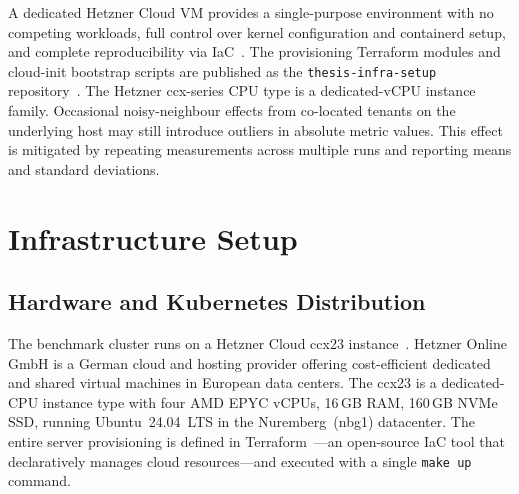 \begin{sloppypar}
A dedicated Hetzner Cloud \acs{VM} provides a single-purpose environment with no competing workloads, full control over kernel configuration and containerd setup, and complete reproducibility via \ac{IaC}~\cite{terraform2024hashicorp}. The provisioning Terraform modules and cloud-init bootstrap scripts are published as the \texttt{thesis-infra-setup} repository~\cite{musaev2026thesisinfra}. The Hetzner ccx-series \acs{CPU} type is a dedicated-vCPU instance family. Occasional noisy-neighbour effects from co-located tenants on the underlying host may still introduce outliers in absolute metric values. This effect is mitigated by repeating measurements across multiple runs and reporting means and standard deviations.
\end{sloppypar}

\section{Infrastructure Setup}
\label{sec:infra_setup}

\subsection{Hardware and Kubernetes Distribution}

\begin{sloppypar}
The benchmark cluster runs on a Hetzner Cloud ccx23 instance~\cite{hetzner2024cloud}. Hetzner Online GmbH is a German cloud and hosting provider offering cost-efficient dedicated and shared virtual machines in European data centers. The ccx23 is a dedicated-\acs{CPU} instance type with four \acs{AMD} EPYC vCPUs, 16\,GB \acs{RAM}, 160\,GB NVMe \acs{SSD}, running Ubuntu~24.04~LTS in the Nuremberg~(nbg1) datacenter. The entire server provisioning is defined in Terraform~\cite{terraform2024hashicorp}---an open-source \acl{IaC} tool that declaratively manages cloud resources---and executed with a single \texttt{make up} command.
\end{sloppypar}

